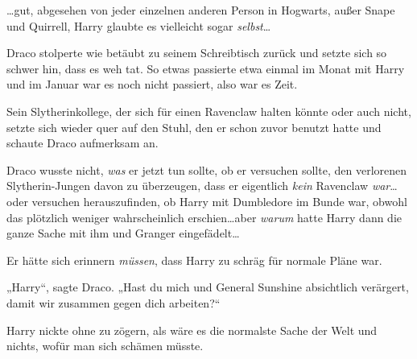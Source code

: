 …gut, abgesehen von jeder einzelnen anderen Person in Hogwarts, außer Snape und Quirrell, Harry glaubte es vielleicht sogar \emph{selbst}…

Draco stolperte wie betäubt zu seinem Schreibtisch zurück und setzte sich so schwer hin, dass es weh tat. So etwas passierte etwa einmal im Monat mit Harry und im Januar war es noch nicht passiert, also war es Zeit.

Sein Slytherinkollege, der sich für einen Ravenclaw halten könnte oder auch nicht, setzte sich wieder quer auf den Stuhl, den er schon zuvor benutzt hatte und schaute Draco aufmerksam an.

Draco wusste nicht, \emph{was} er jetzt tun sollte, ob er versuchen sollte, den verlorenen Slytherin-Jungen davon zu überzeugen, dass er eigentlich \emph{kein} Ravenclaw \emph{war}…oder versuchen herauszufinden, ob Harry mit Dumbledore im Bunde war, obwohl das plötzlich weniger wahrscheinlich erschien…aber \emph{warum} hatte Harry dann die ganze Sache mit ihm und Granger eingefädelt…

Er hätte sich erinnern \emph{müssen}, dass Harry zu schräg für normale Pläne war.

„Harry“, sagte Draco. „Hast du mich und General Sunshine absichtlich verärgert, damit wir zusammen gegen dich arbeiten?“

Harry nickte ohne zu zögern, als wäre es die normalste Sache der Welt und nichts, wofür man sich schämen müsste.

